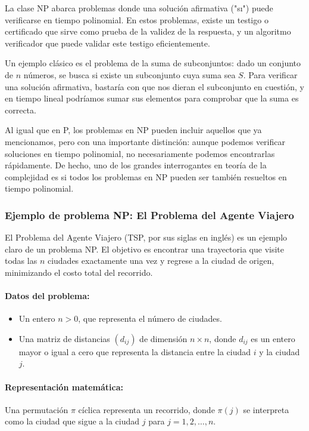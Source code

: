 \documentclass[12pt,titlepage,twoside,openright]{book}
\begin{document}
La clase NP abarca problemas donde una soluci\'on afirmativa ("s\i") puede verificarse en tiempo polinomial. En estos problemas, existe un testigo o certificado que sirve como prueba de la validez de la respuesta, y un algoritmo verificador que puede validar este testigo eficientemente.

Un ejemplo cl\'asico es el problema de la suma de subconjuntos: dado un conjunto de $n$ n\'umeros, se busca si existe un subconjunto cuya suma sea $S$. Para verificar una soluci\'on afirmativa, bastar\'ia con que nos dieran el subconjunto en cuesti\'on, y en tiempo lineal podr\'iamos sumar sus elementos para comprobar que la suma es correcta.

Al igual que en P, los problemas en NP pueden incluir aquellos que ya mencionamos, pero con una importante distinci\'on: aunque podemos verificar soluciones en tiempo polinomial, no necesariamente podemos encontrarlas r\'apidamente. De hecho, uno de los grandes interrogantes en teor\'ia de la complejidad es si todos los problemas en NP pueden ser tambi\'en resueltos en tiempo polinomial.

\subsubsection{Ejemplo de problema NP: El Problema del Agente Viajero}

El Problema del Agente Viajero (TSP, por sus siglas en ingl\'es) es un ejemplo claro de un problema NP. El objetivo es encontrar una trayectoria que visite todas las $n$ ciudades exactamente una vez y regrese a la ciudad de origen, minimizando el costo total del recorrido.

\paragraph{Datos del problema:}
\begin{itemize}
    \item Un entero $n > 0$, que representa el n\'umero de ciudades.
    \item Una matriz de distancias $(d_{ij})$ de dimensi\'on $n \times n$, donde $d_{ij}$ es un entero mayor o igual a cero que representa la distancia entre la ciudad $i$ y la ciudad $j$.
\end{itemize}

\paragraph{Representaci\'on matem\'atica:}
Una permutaci\'on $\pi$ c\'iclica representa un recorrido, donde $\pi(j)$ se interpreta como la ciudad que sigue a la ciudad $j$ para $j = 1, 2, \dots, n$.
\end{document}
